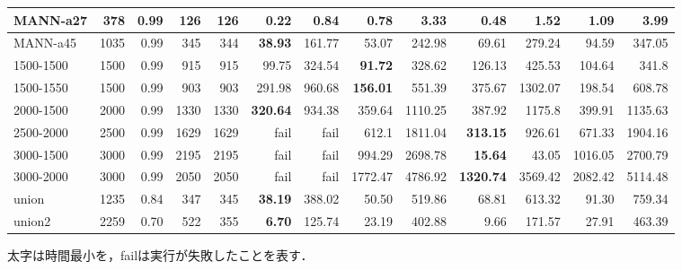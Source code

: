 \begin{table}
{\begin{tabular}{|l|r|r|r|r|r|r|r|r||r|r|r|r|}
    MANN-a27 & 378 & 0.99&126 & 126& \textbf{0.22} & 0.84 & 0.78 & 3.33 & 0.48 & 1.52 & 1.09 & 3.99 \\ \hline
    MANN-a45 & 1035 & 0.99&345 & 344& \textbf{38.93} & 161.77 & 53.07 & 242.98 & 69.61 & 279.24 & 94.59 & 347.05 \\ \hline
    \hline
    1500-1500 & 1500 &0.99& 915 & 915&99.75 & 324.54 & \textbf{91.72} & 328.62 & 126.13 & 425.53 & 104.64 & 341.8 \\ \hline
    1500-1550 & 1500 & 0.99& 903 & 903&291.98 & 960.68 & \textbf{156.01} & 551.39 & 375.67 & 1302.07 & 198.54 & 608.78 \\ \hline
    2000-1500 & 2000 & 0.99& 1330 & 1330& \textbf{320.64} & 934.38 & 359.64 & 1110.25 & 387.92 & 1175.8 & 399.91 & 1135.63 \\ \hline
    2500-2000 & 2500 & 0.99& 1629 & 1629&fail & fail & 612.1 & 1811.04 & \textbf{313.15} & 926.61 & 671.33 & 1904.16 \\ \hline
    3000-1500 & 3000 & 0.99& 2195 & 2195&fail & fail & 994.29 & 2698.78 & \textbf{15.64} & 43.05 & 1016.05 & 2700.79 \\ \hline
    3000-2000 & 3000 & 0.99& 2050 & 2050&fail & fail & 1772.47 & 4786.92 & \textbf{1320.74} & 3569.42 & 2082.42 & 5114.48 \\ \hline
    \hline
    union& 1235 & 0.84&347 & 345 & \textbf{38.19} & 388.02 & 50.50 & 519.86 & 68.81 & 613.32 & 91.30 & 759.34 \\ \hline
    union2 & 2259 &0.70& 522 & 355& \textbf{6.70} & 125.74 & 23.19 & 402.88 & 9.66 & 171.57 & 27.91 & 463.39 \\ \hline

\end{tabular}
    }
    \begin{center}
    \scriptsize 太字は時間最小を，failは実行が失敗したことを表す．
    \end{center}
    \end{table}

